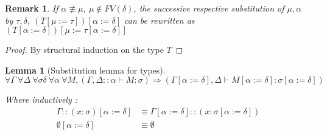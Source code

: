 \documentclass{article}
\newtheorem{lemma}[theorem]{Lemma}
\newtheorem*{remark}{Remark}
\begin{document}
    \begin{remark}\label{remark}
        If $\alpha\not\equiv\mu, \ \mu\not\in FV(\delta)$, the successive respective substitution of $\mu,\alpha$ by $\tau,\delta$, $(T[\mu:=\tau])[\alpha:=\delta]$ can be rewritten as $(T[\alpha:=\delta])[\mu:=\tau[\alpha:=\delta]]$
    \end{remark}

    \begin{proof}
        By structural induction on the type $T$
    \end{proof}
    
    \begin{lemma}[Substitution lemma for types]\label{substitution lemma types}
    $$\forall\Gamma\ \forall\Delta\ \forall\sigma\delta\ \forall\alpha\ \forall M, (\Gamma,\Delta::\alpha\vdash M : \sigma) \Rightarrow (\Gamma[\alpha:=\delta],\Delta\vdash M[\alpha:=\delta] : \sigma[\alpha:=\delta])$$
    
    Where inductively : \begin{align*}
        \Gamma::(x : \sigma)[\alpha:=\delta] &\equiv \Gamma[\alpha:=\delta]::(x : \sigma[\alpha:=\delta])\\
        \emptyset[\alpha:=\delta] &\equiv \emptyset 
    \end{align*}
    \end{lemma}
    
\end{document}
